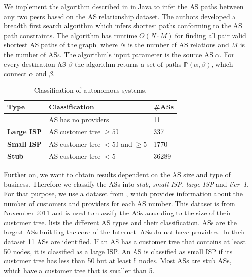 We implement the algorithm described in \cite{yang2009efficient} in Java to infer the AS paths between any two peers based on the AS relationship dataset. The authors developed a breadth first search algorithm which infers shortest paths conforming to the AS path constraints. The algorithm has runtime $O(N\cdot M)$ for finding all pair valid shortest AS paths of the graph, where $N$ is the number of AS relations and $M$ is the number of ASs.
The algorithm's input parameter is the source AS $\alpha$. For every destination AS $\beta$ the algorithm returns a set of paths $\mathbb{P}(\alpha,\beta)$, which connect $\alpha$ and $\beta$.

\begin{table}[tb]
\caption{Classification of autonomous systems.} \label{tab:ASclass}
\begin{center}
{\footnotesize
	\begin{tabular}{|l|l|l|} \hline
		\textbf{Type} & \textbf{Classification} & \textbf{\#ASs} \\ \hline
		\textbf{\Tier} & AS has no providers & 11 \\ \hline
		\textbf{Large ISP} & AS customer tree $\geq50$ & 337 \\ \hline
		\textbf{Small ISP} & AS customer tree $<50$ and $\geq5$ & 1770 \\ \hline
		\textbf{Stub} & AS customer tree $<5$ & 36289 \\ \hline
	\end{tabular}
}
\end{center}
\end{table}

Further on, we want to obtain results dependent on the AS size and type of business. Therefore we classify the ASs into \textit{stub}, \textit{small ISP}, \textit{large ISP} and \textit{tier--1}. For that purpose, we use a dataset from \cite{irlas}, which provides information about the number of customers and providers for each AS number. This dataset is from November 2011 and is used to classify the ASs according to the size of their customer tree.
 lists the different AS types and their classification. \Tier ASs are the largest ASs building the core of the Internet. \Tier ASs do not have providers. In their dataset 11 \tier ASs are identified. If an AS has a customer tree that contains at least 50 nodes, it is classified as a large ISP. An AS is classified as small ISP if its customer tree has less than 50 but at least 5 nodes. Most ASs are stub ASs, which have a customer tree that is smaller than 5.

